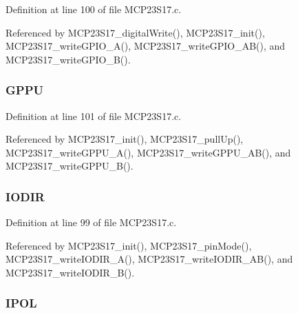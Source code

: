 Definition at line 100 of file M\-C\-P23\-S17.\-c.



Referenced by M\-C\-P23\-S17\-\_\-digital\-Write(), M\-C\-P23\-S17\-\_\-init(), M\-C\-P23\-S17\-\_\-write\-G\-P\-I\-O\-\_\-\-A(), M\-C\-P23\-S17\-\_\-write\-G\-P\-I\-O\-\_\-\-A\-B(), and M\-C\-P23\-S17\-\_\-write\-G\-P\-I\-O\-\_\-\-B().

\hypertarget{structtag_m_c_p23_s17_a1c2b8cf8c22febf5f3aebfea6310fc15}{
\subsubsection[{G\-P\-P\-U}]{ G\-P\-P\-U}}\label{structtag_m_c_p23_s17_a1c2b8cf8c22febf5f3aebfea6310fc15}


Definition at line 101 of file M\-C\-P23\-S17.\-c.



Referenced by M\-C\-P23\-S17\-\_\-init(), M\-C\-P23\-S17\-\_\-pull\-Up(), M\-C\-P23\-S17\-\_\-write\-G\-P\-P\-U\-\_\-\-A(), M\-C\-P23\-S17\-\_\-write\-G\-P\-P\-U\-\_\-\-A\-B(), and M\-C\-P23\-S17\-\_\-write\-G\-P\-P\-U\-\_\-\-B().

\hypertarget{structtag_m_c_p23_s17_aa01df34e48dbb3159f671d1acdc44dbf}{
\subsubsection[{I\-O\-D\-I\-R}]{ I\-O\-D\-I\-R}}\label{structtag_m_c_p23_s17_aa01df34e48dbb3159f671d1acdc44dbf}


Definition at line 99 of file M\-C\-P23\-S17.\-c.



Referenced by M\-C\-P23\-S17\-\_\-init(), M\-C\-P23\-S17\-\_\-pin\-Mode(), M\-C\-P23\-S17\-\_\-write\-I\-O\-D\-I\-R\-\_\-\-A(), M\-C\-P23\-S17\-\_\-write\-I\-O\-D\-I\-R\-\_\-\-A\-B(), and M\-C\-P23\-S17\-\_\-write\-I\-O\-D\-I\-R\-\_\-\-B().

\hypertarget{structtag_m_c_p23_s17_a97413bedb26c0c521ead0632dcb949a4}{
\subsubsection[{I\-P\-O\-L}]{ I\-P\-O\-L}}\label{structtag_m_c_p23_s17_a97413bedb26c0c521ead0632dcb949a4}



